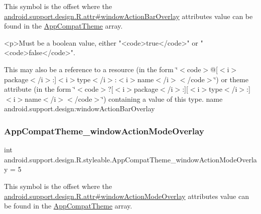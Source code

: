 This symbol is the offset where the \hyperlink{classandroid_1_1support_1_1design_1_1R_1_1attr_a2dd003742e176a3aca66a2d4064b7bab}{android.\+support.\+design.\+R.\+attr\#window\+Action\+Bar\+Overlay} attribute\textquotesingle{}s value can be found in the \hyperlink{classandroid_1_1support_1_1design_1_1R_1_1styleable_afb351dc8de20cbd4c89abe360373010c}{App\+Compat\+Theme} array.

\begin{DoxyVerb}      <p>Must be a boolean value, either "<code>true</code>" or "<code>false</code>".
\end{DoxyVerb}
 

This may also be a reference to a resource (in the form \char`\"{}$<$code$>$@\mbox{[}$<$i$>$package$<$/i$>$\+:\mbox{]}$<$i$>$type$<$/i$>$\+:$<$i$>$name$<$/i$>$$<$/code$>$\char`\"{}) or theme attribute (in the form \char`\"{}$<$code$>$?\mbox{[}$<$i$>$package$<$/i$>$\+:\mbox{]}\mbox{[}$<$i$>$type$<$/i$>$\+:\mbox{]}$<$i$>$name$<$/i$>$$<$/code$>$\char`\"{}) containing a value of this type.  name android.\+support.\+design\+:window\+Action\+Bar\+Overlay \mbox{\label{classandroid_1_1support_1_1design_1_1R_1_1styleable_add8f8ab4f925ac3f15d7337d40a9ecd8}} 
\subsubsection{\texorpdfstring{App\+Compat\+Theme\+\_\+window\+Action\+Mode\+Overlay}{AppCompatTheme\_windowActionModeOverlay}}
{\footnotesize\ttfamily int android.\+support.\+design.\+R.\+styleable.\+App\+Compat\+Theme\+\_\+window\+Action\+Mode\+Overlay = 5\hspace{0.3cm}{\ttfamily [static]}}

This symbol is the offset where the \hyperlink{classandroid_1_1support_1_1design_1_1R_1_1attr_a636b996e7c817a05b1b9d5726df2cbde}{android.\+support.\+design.\+R.\+attr\#window\+Action\+Mode\+Overlay} attribute\textquotesingle{}s value can be found in the \hyperlink{classandroid_1_1support_1_1design_1_1R_1_1styleable_afb351dc8de20cbd4c89abe360373010c}{App\+Compat\+Theme} array.

